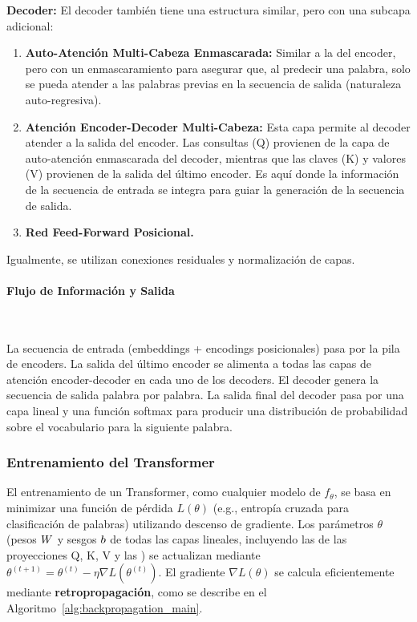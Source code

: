 \textbf{Decoder:} El decoder también tiene una estructura similar, pero con una subcapa adicional:
\begin{enumerate}
    \item \textbf{Auto-Atención Multi-Cabeza Enmascarada:} Similar a la del encoder, pero con un enmascaramiento para asegurar que, al predecir una palabra, solo se pueda atender a las palabras previas en la secuencia de salida (naturaleza auto-regresiva).
    \item \textbf{Atención Encoder-Decoder Multi-Cabeza:} Esta capa permite al decoder atender a la salida del encoder. Las consultas (Q) provienen de la capa de auto-atención enmascarada del decoder, mientras que las claves (K) y valores (V) provienen de la salida del último encoder. Es aquí donde la información de la secuencia de entrada se integra para guiar la generación de la secuencia de salida.
    \item \textbf{Red Feed-Forward Posicional.}
\end{enumerate}
Igualmente, se utilizan conexiones residuales y normalización de capas.

\paragraph{Flujo de Información y Salida} \

La secuencia de entrada (embeddings + encodings posicionales) pasa por la pila de encoders. La salida del último encoder se alimenta a todas las capas de atención encoder-decoder en cada uno de los decoders. El decoder genera la secuencia de salida palabra por palabra. La salida final del decoder pasa por una capa lineal y una función softmax para producir una distribución de probabilidad sobre el vocabulario para la siguiente palabra.

\subsubsection*{Entrenamiento del Transformer}
\label{subsubsec:TransformerTraining}
El entrenamiento de un Transformer, como cualquier modelo de  $f_{\theta}$, se basa en minimizar una función de pérdida $L(\theta)$ (e.g., entropía cruzada para clasificación de palabras) utilizando descenso de gradiente. Los parámetros $\theta$ (pesos $W$ y sesgos $b$ de todas las capas lineales, incluyendo las de las proyecciones Q, K, V y las ) se actualizan mediante $\theta^{(t+1)} = \theta^{(t)} - \eta \nabla L(\theta^{(t)})$. El gradiente $\nabla L(\theta)$ se calcula eficientemente mediante \textbf{retropropagación}, como se describe en el Algoritmo~\ref{alg:backpropagation_main}.

